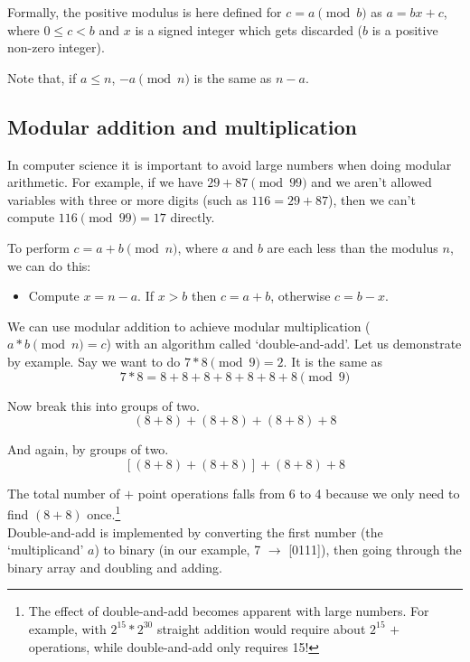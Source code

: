Formally, the positive modulus is here defined for $c = a \pmod b$ as $a=bx+c$, where $0\leq{c}<{b}$ and $x$ is a signed integer which gets discarded ($b$ is a positive non-zero integer).

Note that, if $a \leq n$, $-a \pmod n$ is the same as $n - a$.


\subsection{Modular addition and multiplication}
\label{subsec:modular-addition-multiplication}

In computer science it is important to avoid large numbers when doing modular arithmetic. For example, if we have $29+87 \pmod{99}$ and we aren't allowed variables with three or more digits (such as $116 = 29+87$), then we can't compute $116 \pmod{99} = 17$ directly.

To perform $c = a+b \pmod n$, where $a$ and $b$ are each less than the modulus $n$, we can do this:
\begin{itemize}
	\item Compute $x = n-a$. If $x > b$ then $c = a+b$, otherwise $c = b - x$.
\end{itemize}

We can use modular addition to achieve modular multiplication ($a*b \pmod n = c$) with an algorithm called `double-and-add'. Let us demonstrate by example. Say we want to do $7*8 \pmod 9 = 2$. It is the same as 
\[7*8 = 8+8+8+8+8+8+8 \pmod 9\]

Now break this into groups of two. 
\[(8+8) + (8+8) + (8+8) + 8\]

And again, by groups of two.
\[[(8+8) + (8+8)] + (8+8) + 8\]

The total number of $+$ point operations falls from 6 to 4 because we only need to find $(8+8)$ once.\footnote{The effect of double-and-add becomes apparent with large numbers. For example, with $2^{15} * 2^{30}$ straight addition would require about $2^{15}$ $+$ operations, while double-and-add only requires 15!}\\

Double-and-add is implemented by converting the first number (the `multiplicand' $a$) to binary (in our example, 7 $\rightarrow$ [0111]), then going through the binary array and doubling and adding. 

